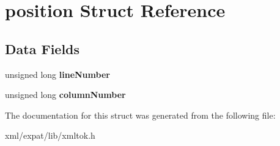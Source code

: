 \hypertarget{structposition}{\section{position Struct Reference}
\label{structposition}
}
\subsection*{Data Fields}
\begin{DoxyCompactItemize}
\item 
\hypertarget{structposition_ad8226983cbeff3e99935a31a5b75bd63}{unsigned long {\bfseries line\-Number}}\label{structposition_ad8226983cbeff3e99935a31a5b75bd63}

\item 
\hypertarget{structposition_ad21006a481879c78998c6a5d0d5a8b9b}{unsigned long {\bfseries column\-Number}}\label{structposition_ad21006a481879c78998c6a5d0d5a8b9b}

\end{DoxyCompactItemize}


The documentation for this struct was generated from the following file\-:\begin{DoxyCompactItemize}
\item 
xml/expat/lib/xmltok.\-h\end{DoxyCompactItemize}
